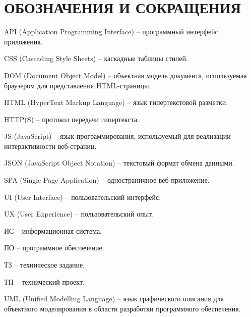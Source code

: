 \section*{ОБОЗНАЧЕНИЯ И СОКРАЩЕНИЯ}

API (Application Programming Interface) -- программный интерфейс приложения.

CSS (Cascading Style Sheets) -- каскадные таблицы стилей.

DOM (Document Object Model) -- объектная модель документа, используемая браузером для представления HTML-страницы.

HTML (HyperText Markup Language) -- язык гипертекстовой разметки.

HTTP(S) -- протокол передачи гипертекста.

JS (JavaScript) -- язык программирования, используемый для реализации интерактивности веб-страниц.

JSON (JavaScript Object Notation) -- текстовый формат обмена данными.

SPA (Single Page Application) -- одностраничное веб-приложение.

UI (User Interface) -- пользовательский интерфейс.

UX (User Experience) -- пользовательский опыт.

ИС -- информационная система.

ПО -- программное обеспечение.

ТЗ -- техническое задание.

ТП -- технический проект.

UML (Unified Modelling Language) -- язык графического описания для объектного моделирования в области разработки программного обеспечения.
